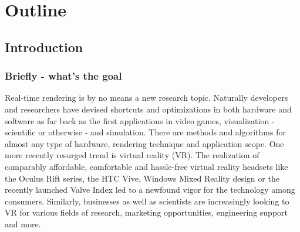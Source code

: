 
\chapter{Outline}

\section{Introduction}
\subsection{Briefly - what's the goal}
Real-time rendering is by no means a new research topic. Naturally developers and researchers have devised shortcuts and optimizations in both hardware and software as far back as the first applications in video games, visualization - scientific or otherwise - and simulation. There are methods and algorithms for almost any type of hardware, rendering technique and application scope. 
One more recently resurged trend is virtual reality (VR). The realization of comparably affordable, comfortable and hassle-free virtual reality headsets like the Oculus Rift series, the HTC Vive, Windows Mixed Reality design or the recently launched Valve Index led to a newfound vigor for the technology among consumers. Similarly, businesses as well as scientists are increasingly looking to VR for various fields of research, marketing opportunities, engineering support and more. \\
